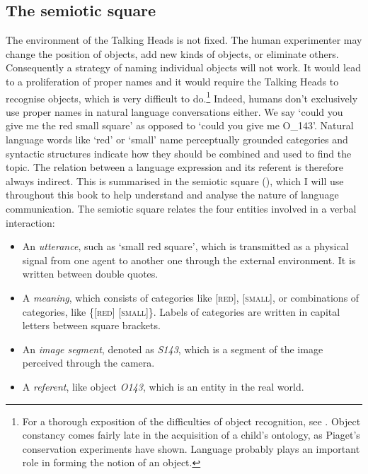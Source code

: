 \subsection{The semiotic square}

The environment of the Talking Heads is 
not fixed. The human experimenter 
may change the position of objects, add new kinds of 
objects, or eliminate
others. Consequently a strategy of naming individual objects
will not work. It would lead to a proliferation of 
proper names and it would require the Talking Heads to
recognise objects, which is very difficult to do.\footnote{
For a thorough exposition of the difficulties of 
object recognition, see \cite{Ullman:1996}. 
Object constancy comes fairly late in the 
acquisition of a child's ontology, as Piaget's conservation
experiments have shown. Language probably plays an important
role in forming the notion of an object.}
Indeed, humans don't exclusively use proper names in 
natural language conversations 
either. We say `could you give me the red small square' as 
opposed to `could you give me O\_143'. Natural language
words like `red' or `small' name perceptually grounded categories
and syntactic structures indicate how they should
be combined and used to find the topic. The relation between 
a language expression and its referent is therefore 
always indirect. This is summarised
in the semiotic square (), which I will use throughout this book to 
help understand and analyse the nature of language communication. 
The semiotic square relates the four entities
involved in a verbal interaction: 
\begin{itemize}
\item An {\itshape utterance}, such as `small red square', which is 
transmitted as a physical 
signal from one agent to another one through the 
external environment. It is written between double quotes. 
\item A {\itshape meaning}, which consists of categories like [\textsc{red}], [\textsc{small}], 
or combinations of categories, like \{[\textsc{red}] [\textsc{small}]\}. Labels of 
categories are written in capital letters between 
square brackets. 
\clearpage
\item An {\itshape image segment}, denoted as \emph{S143}, which is 
a segment of the image perceived through the camera.
\item A {\itshape referent}, like object \emph{O143}, which is 
an entity in the real world. 
\end{itemize}


